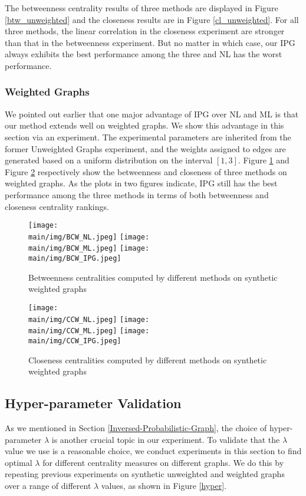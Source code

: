 \documentclass[\main/thesis.tex]{subfiles}
\begin{document}
The betweenness centrality results of three methods are displayed in Figure \ref{btw_unweighted} and the closeness results are in Figure \ref{cl_unweighted}. For all three methods, the linear correlation in the closeness experiment are stronger than that in the betweenness experiment. But no matter in which case, our IPG always exhibits the best performance among the three and NL has the worst performance.

\subsubsection{Weighted Graphs}
We pointed out earlier that one major advantage of IPG over NL and ML is that our method extends well on weighted graphs. We show this advantage in this section via an experiment. The experimental parameters are inherited from the former Unweighted Graphs experiment, and the weights assigned to edges are generated based on a uniform distribution on the interval $[1,3]$. Figure \ref{btw_weighted} and Figure \ref{cl_weighted} respectively show the betweenness and closeness of three methods on weighted graphs. As the plots in two figures indicate, IPG still has the best performance among the three methods in terms of both betweenness and closeness centrality rankings.

\begin{figure}
\texttt{[image: \\main/img/BCW\_NL.jpeg]}
\texttt{[image: \\main/img/BCW\_ML.jpeg]}
\centering
\texttt{[image: \\main/img/BCW\_IPG.jpeg]}
\caption{Betweenness centralities computed by different methods on synthetic weighted graphs}
\label{btw_weighted}
\end{figure}


\begin{figure}
\texttt{[image: \\main/img/CCW\_NL.jpeg]}
\texttt{[image: \\main/img/CCW\_ML.jpeg]}
\centering
\texttt{[image: \\main/img/CCW\_IPG.jpeg]}
\caption{Closeness centralities computed by different methods on synthetic weighted graphs}
\label{cl_weighted}
\end{figure}


\subsection{Hyper-parameter Validation} \label{Hyper-Parameter-Validation}
As we mentioned in Section \ref{Inversed-Probabilistic-Graph}, the choice of hyper-parameter $\lambda$ is another crucial topic in our experiment. To validate that the $\lambda$ value we use is a reasonable choice, we conduct experiments in this section to find optimal $\lambda$ for different centrality measures on different graphs. We do this by repeating previous experiments on synthetic unweighted and weighted graphs over a range of different $\lambda$ values, as shown in Figure \ref{hyper}.
\end{document}
